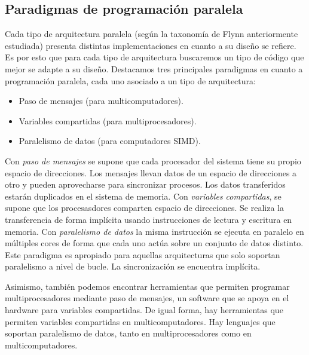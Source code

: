 \subsection{Paradigmas de programación paralela}
Cada tipo de arquitectura paralela (según la taxonomía de Flynn anteriormente estudiada) presenta distintas implementaciones en cuanto a su diseño se refiere. Es por esto que para cada tipo de arquitectura buscaremos un tipo de código que mejor se adapte a su diseño. Destacamos tres principales paradigmas en cuanto a programación paralela, cada uno asociado a un tipo de arquitectura:
\begin{itemize}
    \item Paso de mensajes (para multicomputadores).
    \item Variables compartidas (para multiprocesadores). 
    \item Paralelismo de datos (para computadores SIMD).
\end{itemize}
Con \emph{paso de mensajes} se supone que cada procesador del sistema tiene su propio espacio de direcciones. Los mensajes llevan datos de un espacio de direcciones a otro y pueden aprovecharse para sincronizar procesos. Los datos transferidos estarán duplicados en el sistema de memoria. Con \emph{variables compartidas}, se supone que los procesasdores comparten espacio de direcciones. Se realiza la transferencia de forma implícita usando instrucciones de lectura y escritura en memoria. Con \emph{paralelismo de datos} la misma instrucción se ejecuta en paralelo en múltiples cores de forma que cada uno actúa sobre un conjunto de datos distinto. Este paradigma es apropiado para aquellas arquitecturas que solo soportan paralelismo a nivel de bucle. La sincronización se encuentra implícita. 

Asimismo, también podemos encontrar herramientas que permiten programar multiprocesadores mediante paso de mensajes, un software que se apoya en el hardware para variables compartidas. De igual forma, hay herramientas que permiten variables compartidas en multicomputadores. Hay lenguajes que soportan paralelismo de datos, tanto en multiprocesadores como en multicomputadores.

